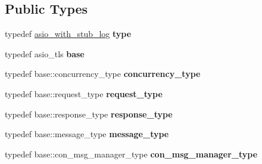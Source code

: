 \subsection*{Public Types}
\begin{DoxyCompactItemize}
\item 
\mbox{\label{structfc_1_1http_1_1detail_1_1asio__tls__with__stub__log_a8cca01512519b25397f37ad8bda17a7d}} 
typedef \mbox{\hyperlink{structfc_1_1http_1_1detail_1_1asio__with__stub__log}{asio\+\_\+with\+\_\+stub\+\_\+log}} {\bfseries type}
\item 
\mbox{\label{structfc_1_1http_1_1detail_1_1asio__tls__with__stub__log_a3ed2ba8d52ab9e360f7ffad0bf0f4cfc}} 
typedef asio\+\_\+tls {\bfseries base}
\item 
\mbox{\label{structfc_1_1http_1_1detail_1_1asio__tls__with__stub__log_aa0e0ac76625973df042e8d8a58004008}} 
typedef base\+::concurrency\+\_\+type {\bfseries concurrency\+\_\+type}
\item 
\mbox{\label{structfc_1_1http_1_1detail_1_1asio__tls__with__stub__log_a33950985ab757fb9a2bbd15f84d0c1d3}} 
typedef base\+::request\+\_\+type {\bfseries request\+\_\+type}
\item 
\mbox{\label{structfc_1_1http_1_1detail_1_1asio__tls__with__stub__log_a512e9aec25fa227bf4441534210b97c8}} 
typedef base\+::response\+\_\+type {\bfseries response\+\_\+type}
\item 
\mbox{\label{structfc_1_1http_1_1detail_1_1asio__tls__with__stub__log_aca6af7aadf77c6f81256b70999379332}} 
typedef base\+::message\+\_\+type {\bfseries message\+\_\+type}
\item 
\mbox{\label{structfc_1_1http_1_1detail_1_1asio__tls__with__stub__log_a8af9d0f9cc1ebbcc3a1fe55f672dff60}} 
typedef base\+::con\+\_\+msg\+\_\+manager\+\_\+type {\bfseries con\+\_\+msg\+\_\+manager\+\_\+type}
\item 

\end{DoxyCompactItemize}
